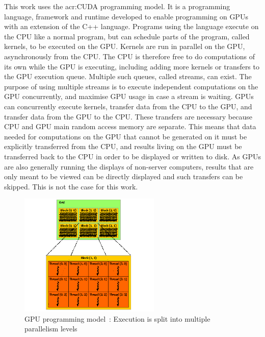 This work uses the \acrshort{acr:CUDA} programming model. It is a programming language, framework
and runtime developed to enable programming on GPUs with an extension of the C++ language. Programs
using the language execute on the CPU like a normal program, but can schedule parts of the program,
called kernels, to be executed on the GPU. Kernels are run in parallel on the GPU, asynchronously
from the CPU. The CPU is therefore free to do computations of its own while the GPU is executing,
including adding more kernels or transfers to the GPU execution queue. Multiple such queues, called
streams, can exist. The purpose of using multiple streams is to execute independent computations on
the GPU concurrently, and maximise GPU usage in case a stream is waiting. GPUs can concurrently
execute kernels, transfer data from the CPU to the GPU, and transfer data from the GPU to the CPU.
These transfers are necessary because CPU and GPU main random access memory are separate. This means
that data needed for computations on the GPU that cannot be generated on it must be explicitly
transferred from the CPU, and results living on the GPU must be transferred back to the CPU in order
to be displayed or written to disk. As GPUs are also generally running the displays of non-server
computers, results that are only meant to be viewed can be directly displayed and such transfers can
be skipped. This is not the case for this work. 

\begin{figure}[H]
	\centering
	\includegraphics[width=0.6\textwidth]{Chapter_graphics_processing_units/media/grid-of-thread-blocks}
	\caption{GPU programming model~\cite{Nvidia2021}: Execution is split into multiple parallelism levels}
	\label{fig:gpu_programming_model}
\end{figure}


